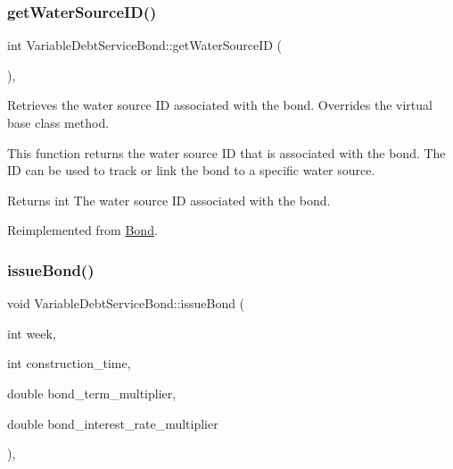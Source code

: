 \subsubsection{\texorpdfstring{get\+Water\+Source\+I\+D()}{getWaterSourceID()}}
{\footnotesize\ttfamily int Variable\+Debt\+Service\+Bond\+::get\+Water\+Source\+ID (\begin{DoxyParamCaption}{ }\end{DoxyParamCaption})\hspace{0.3cm}{\ttfamily [override]}, {\ttfamily [virtual]}}



Retrieves the water source ID associated with the bond. Overrides the virtual base class method. 

This function returns the water source ID that is associated with the bond. The ID can be used to track or link the bond to a specific water source.

\begin{DoxyReturn}{Returns}
int The water source ID associated with the bond. 
\end{DoxyReturn}


Reimplemented from \mbox{\hyperlink{classBond_a8190ab6482e6a9481afca4840147527e}{Bond}}.

\mbox{\label{classVariableDebtServiceBond_a7d91921482f01d9bb37dba6e6d085771}} 
\subsubsection{\texorpdfstring{issue\+Bond()}{issueBond()}}
{\footnotesize\ttfamily void Variable\+Debt\+Service\+Bond\+::issue\+Bond (\begin{DoxyParamCaption}\item[{int}]{week,  }\item[{int}]{construction\+\_\+time,  }\item[{double}]{bond\+\_\+term\+\_\+multiplier,  }\item[{double}]{bond\+\_\+interest\+\_\+rate\+\_\+multiplier }\end{DoxyParamCaption})\hspace{0.3cm}{\ttfamily [override]}, {\ttfamily [virtual]}}



